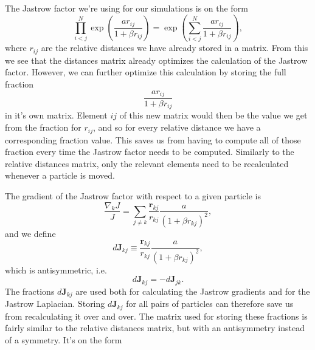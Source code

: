 \documentclass[../main.tex]{subfiles}
\begin{document}
The Jastrow factor we're using for our simulations is on the form
\begin{equation}
    \prod_{i<j}^N \exp\left(\frac{ar_{ij}}{1+\beta r_{ij}}\right) = \exp\left(\sum_{i<j}^N \frac{ar_{ij}}{1+\beta r_{ij}}\right),
\end{equation}
where $r_{ij}$ are the relative distances we have already stored in a matrix. From this we see that the distances matrix already optimizes the calculation of the Jastrow factor. However, we can further optimize this calculation by storing the full fraction 
\begin{equation}
    \frac{ar_{ij}}{1+\beta r_{ij}}
\end{equation}
in it's own matrix. Element $ij$ of this new matrix would then be the value we get from the fraction for $r_{ij}$, and so for every relative distance we have a corresponding fraction value. This saves us from having to compute all of those fraction every time the Jastrow factor needs to be computed. Similarly to the relative distances matrix, only the relevant elements need to be recalculated whenever a particle is moved. 

The gradient of the Jastrow factor with respect to a given particle is
\begin{equation}
    \frac{\nabla_k J}{J} = \sum_{j\neq k} \frac{\mathbf{r}_{kj}}{r_{kj}} \frac{a}{(1+\beta r_{kj})^2},
\end{equation}
and we define
\begin{equation}
    d\mathbf{J}_{kj} \equiv \frac{\mathbf{r}_{kj}}{r_{kj}} \frac{a}{(1+\beta r_{kj})^2},
\end{equation}
which is antisymmetric, i.e.
\begin{equation}
    d\mathbf{J}_{kj} = -d\mathbf{J}_{jk}.
\end{equation}
The fractions $d\mathbf{J}_{kj}$ are used both for calculating the Jastrow gradients and for the Jastrow Laplacian. Storing $d\mathbf{J}_{kj}$ for all pairs of particles can therefore save us from recalculating it over and over. The matrix used for storing these fractions is fairly similar to the relative distances matrix, but with an antisymmetry instead of a symmetry. It's on the form
\end{document}
